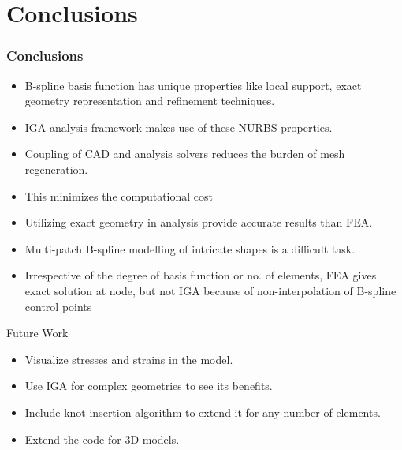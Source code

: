 \documentclass{beamer}
\begin{document}
\section{Conclusions}
\begin{frame} \frametitle{Conclusions}
  \begin{itemize}
      \item B-spline basis function has unique properties like local support, exact geometry representation and refinement techniques.
      \item IGA analysis framework makes use of these NURBS properties.
      \item Coupling of CAD and analysis solvers reduces the burden of mesh regeneration.
      \item This minimizes the computational cost
      \item Utilizing exact geometry in analysis provide accurate results than FEA. 
      \item Multi-patch B-spline modelling of intricate shapes is a difficult task.
      \item Irrespective of the degree of basis function or no. of elements, FEA gives exact solution at node, but not IGA because of non-interpolation of B-spline control points      
  \end{itemize}
\end{frame}
\newpage
\begin{frame}{Future Work}
\begin{itemize}
    \item Visualize stresses and strains in the model.
    \item Use IGA for complex geometries to see its benefits.
    \item Include knot insertion algorithm to extend it for any number of elements.
    \item Extend the code for 3D models.
    
\end{itemize}
    
\end{frame}

\end{document}
